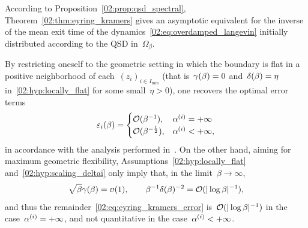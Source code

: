     According to Proposition~\ref{02:prop:qsd_spectral}, Theorem~\ref{02:thm:eyring_kramers} gives an asymptotic equivalent for the inverse of the mean exit time of the dynamics~\eqref{02:eq:overdamped_langevin} initially distributed according to the QSD in~$\Omega_\beta$.
     \begin{remark}
        By restricting oneself to the geometric setting in which the boundary is flat in a positive neighborhood of each~$(z_i)_{i\in I_{\min}}$ (that is~$\gamma(\beta)=0$ and~$\delta(\beta)=\eta$ in~\eqref{02:hyp:locally_flat} for some small~$\eta>0$), one recovers the optimal error terms
        \[
        \varepsilon_i(\beta)=\begin{cases}
            \mathcal{O}(\beta^{-1}),&\alpha^{(i)}=+\infty\\
            \mathcal{O}(\beta^{-\frac12}),&\alpha^{(i)}<+\infty,
        \end{cases}
        \]
        in accordance with the analysis performed in~\cite{LPN21}. On the other hand, aiming for maximum geometric flexibility, Assumptions~\eqref{02:hyp:locally_flat} and~\eqref{02:hyp:scaling_deltai} only imply that, in the limit~$\beta\to\infty$,
        \[\sqrt\beta\smallRadius(\beta)=\smallo(1),\qquad\beta^{-1}\largeRadius(\beta)^{-2}=\O(|\log\beta|^{-1}),\]
        and thus the remainder~\eqref{02:eq:eyring_kramers_error} is~$\mathcal{O}(|\log\beta|^{-1})$ in the case~$\alpha^{(i)}=+\infty$, and not quantitative in the case~$\alpha^{(i)}<+\infty$.
    \end{remark}

